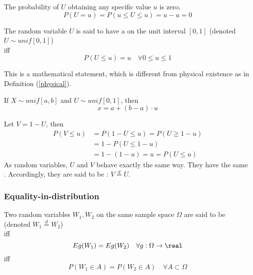 \documentclass[11pt]{article}
\numberwithin{equation}{section}
\begin{document}
\corollary
The probability of $U$ obtaining any specific value $u$ is zero.
\begin{equation}
	P(U = u) = P(u \leq U \leq u) = u - u = 0
\end{equation}

 The random variable $U$ is said to have a  on the unit interval $[0, 1]$ (denoted $U \sim unif[0, 1]$) \\
iff \\
\begin{equation}
	P(U \leq u) = u \quad \forall 0 \leq u \leq 1
\end{equation}

\remark
This is a mathematical statement, which is different from physical existence as in Definition (\ref{physical}).

\corollary
If $X \sim unif[a, b]$ and $U \sim unif[0, 1]$, then
\begin{equation}
	x = a + (b-a)\cdot u
\end{equation}

\example
Let $V = 1 - U$, then
\begin{align}
	P(V \leq u) &= P(1-U \leq u) = P(U \geq 1-u) \\
	&= 1 - P(U \leq 1 - u) \\
	&= 1 - (1-u) = u = P(U \leq u)
\end{align}
As random variables, $U$ and $V$ behave exactly the same way. They have the same . Accordingly, they are said to be : $V \overset{d}{=} U$.

\subsubsection{Equality-in-distribution}
 Two random variables $W_1, W_2$ on the same sample space $\Omega$ are said to be  (denoted $W_1 \overset{d}{=} W_2$)\\
iff \\
\begin{equation}
	Eg(W_1) = Eg(W_2) \quad \forall g: \Omega \rightarrow \real
\end{equation}
iff \\
\begin{equation}
	P(W_1 \in A) = P(W_2 \in A) \quad \forall A \subset \Omega
\end{equation}
\end{document}
